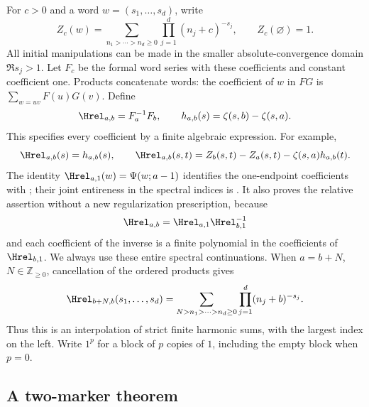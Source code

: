 For $c>0$ and a word $w=(s_1,\ldots,s_d)$, write
\[
 Z_c(w)=\sum_{n_1>\cdots>n_d\ge0}
              \prod_{j=1}^d(n_j+c)^{-s_j},
 \qquad Z_c(\varnothing)=1.
\]
All initial manipulations can be made in the smaller absolute-convergence
domain $\Re s_j>1$.  Let $F_c$ be the formal word series with these
coefficients and constant coefficient one.  Products concatenate words:
the coefficient of $w$ in $FG$ is $\sum_{w=uv}F(u)G(v)$.  Define
\begin{equation}\label{ord:relative}
             \Hrel_{a,b}=F_a^{-1}F_b,\qquad
             h_{a,b}(s)=\zeta(s,b)-\zeta(s,a).
\end{equation}
This specifies every coefficient by a finite algebraic expression.  For
example,
\[
 \Hrel_{a,b}(s)=h_{a,b}(s),\qquad
 \Hrel_{a,b}(s,t)=Z_b(s,t)-Z_a(s,t)-\zeta(s,a)h_{a,b}(t).
\]
The identity $\Hrel_{a,1}(w)=\Psi(w;a-1)$ identifies the one-endpoint
coefficients with \cite[Proposition~2.1]{INY}; their joint entireness in
the spectral indices is \cite[Corollary~4.2]{INY}.  It also proves the
relative assertion without a new regularization prescription, because
\[
                 \Hrel_{a,b}=\Hrel_{a,1}\Hrel_{b,1}^{-1}
\]
and each coefficient of the inverse is a finite polynomial in the
coefficients of $\Hrel_{b,1}$.  We always use these entire spectral continuations.
When $a=b+N$, $N\in\mathbb Z_{\ge0}$, cancellation of the ordered products
gives
\begin{equation}\label{ord:finite}
 \Hrel_{b+N,b}(s_1,\ldots,s_d)
   =\sum_{N>n_1>\cdots>n_d\ge0}
             \prod_{j=1}^d(n_j+b)^{-s_j}.
\end{equation}
Thus this is an interpolation of strict finite harmonic sums, with the
largest index on the left.  Write $1^p$ for a block of $p$ copies of $1$,
including the empty block when $p=0$.

\subsection{A two-marker theorem}

